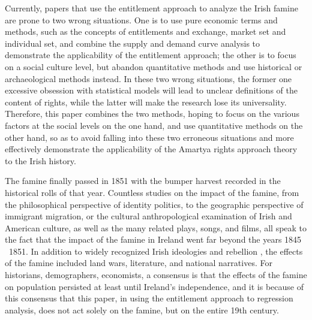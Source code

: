 Currently, papers that use the entitlement approach to analyze the Irish famine are prone to two wrong situations. One is to use pure economic terms and methods, such as the concepts of entitlements and exchange, market set and individual set, and combine the supply and demand curve analysis to demonstrate the applicability of the entitlement approach; the other is to focus on a social culture level, but abandon quantitative methods and use historical or archaeological methods instead. In these two wrong situations, the former one excessive obsession with statistical models will lead to unclear definitions of the content of rights, while the latter will make the research lose its universality. Therefore, this paper combines the two methods, hoping to focus on the various factors at the social levels on the one hand, and use quantitative methods on the other hand, so as to avoid falling into these two erroneous situations and more effectively demonstrate the applicability of the Amartya rights approach theory to the Irish history.

The famine finally passed in 1851 with the bumper harvest recorded in the historical rolls of that year. Countless studies on the impact of the famine, from the philosophical perspective of identity politics, to the geographic perspective of immigrant migration, or the cultural anthropological examination of Irish and American culture, as well as the many related plays, songs, and films, all speak to the fact that the impact of the famine in Ireland went far beyond the years 1845 \textemdash\ 1851. In addition to widely recognized Irish ideologies and rebellion \citep{kinealy2017great}, the effects of the famine included land wars, literature, and national narratives.  For historians, demographers, economists, a consensus is that the effects of the famine on population persisted at least until Ireland's independence, and it is because of this consensus that this paper, in using the entitlement approach to regression analysis, does not act solely on the famine, but on the entire 19th century.

